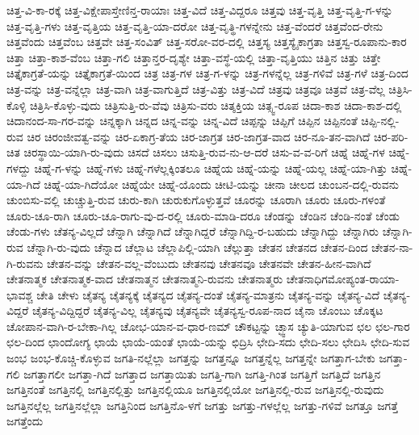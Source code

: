 {ಚಿತ್ತ-ವಿ-ಕಾ-ರಕ್ಕೆ
ಚಿತ್ತ-ವಿಕ್ಷೇಪಾಸ್ತೇಣಿನ್ತ-ರಾಯಾಃ
ಚಿತ್ತ-ವಿದೆ
ಚಿತ್ತ-ವಿದ್ದರೂ
ಚಿತ್ತವು
ಚಿತ್ತ-ವೃತ್ತಿ
ಚಿತ್ತ-ವೃತ್ತಿ-ಗ-ಳನ್ನು
ಚಿತ್ತ-ವೃತ್ತಿ-ಗಳು
ಚಿತ್ತ-ವೃತ್ತಿಯ
ಚಿತ್ತ-ವೃತ್ತಿ-ಯಾ-ದರೋ
ಚಿತ್ತ-ವೃತ್ಥಿ-ಗಳನ್ನೇನು
ಚಿತ್ತ-ವೆಂದರೆ
ಚಿತ್ತವೆಂದ-ರೇನು
ಚಿತ್ತವೆಂದು
ಚಿತ್ತವೆಂಬ
ಚಿತ್ತವೇ
ಚಿತ್ತ-ಸಂವಿತ್
ಚಿತ್ತ-ಸರೋ-ವರ-ದಲ್ಲಿ
ಚಿತ್ತಸ್ಯ
ಚಿತ್ತಸ್ಯೈಕಾಗ್ರತಾ
ಚಿತ್ತಸ್ವ-ರೂಪಾನು-ಕಾರ
ಚಿತ್ತಾ
ಚಿತ್ತಾ-ಕಾಶ-ವೆಂಬ
ಚಿತ್ತಾ-ಗಲಿ
ಚಿತ್ತಾನ್ತರ-ದೃಶ್ಯೇ
ಚಿತ್ತಾ-ವಸ್ಥೆ-ಯಲ್ಲಿ
ಚಿತ್ತಾ-ವೃತ್ತಿಯು
ಚಿತ್ತಿನ
ಚಿತ್ತು
ಚಿತ್ತೇ
ಚಿತ್ತೈಕಾಗ್ರತೆ-ಯನ್ನು
ಚಿತ್ತೈಕಾಗ್ರತೆ-ಯಿಂದ
ಚಿತ್ರ
ಚಿತ್ರ-ಗಳ
ಚಿತ್ರ-ಗ-ಳನ್ನು
ಚಿತ್ರ-ಗಳನ್ನೆಲ್ಲ
ಚಿತ್ರ-ಗಳಿವೆ
ಚಿತ್ರ-ಗಳೆ
ಚಿತ್ರ-ದಿಂದ
ಚಿತ್ರ-ವನ್ನು
ಚಿತ್ರ-ವನ್ನೆಲ್ಲಾ
ಚಿತ್ರ-ವಾಗಿ
ಚಿತ್ರ-ವಾಗುತ್ತಿದೆ
ಚಿತ್ರ-ವಿತ್ತು
ಚಿತ್ರ-ವಿದೆ
ಚಿತ್ರವು
ಚಿತ್ರವೂ
ಚಿತ್ರವೆ
ಚಿತ್ರ-ವೆಲ್ಲ
ಚಿತ್ರಿಸಿ-ಕೊಳ್ಳಿ
ಚಿತ್ರಿಸಿ-ಕೊಳ್ಳು-ವುದು
ಚಿತ್ರಿಸುತ್ತಿ-ರು-ವೆವು
ಚಿತ್ರಿಸು-ವರು
ಚಿತ್ಶಕ್ತಿಯ
ಚಿತ್ಸ್ವ-ರೂಪ
ಚಿದಾ-ಕಾಶ
ಚಿದಾ-ಕಾಶ-ದಲ್ಲಿ
ಚಿದಾನಂದ-ಸಾ-ಗರ-ವನ್ನು
ಚಿನ್ನಕ್ಕಾಗಿ
ಚಿನ್ನದ
ಚಿನ್ನ-ವನ್ನು
ಚಿನ್ನ-ವಿದೆ
ಚಿಪ್ಪನ್ನು
ಚಿಪ್ಪಿಗೆ
ಚಿಪ್ಪಿನ
ಚಿಪ್ಪಿನಂತೆ
ಚಿಪ್ಪಿ-ನಲ್ಲಿ-ರುವ
ಚಿರ
ಚಿರಂಜೀವತ್ವ-ವನ್ನು
ಚಿರ-ಏಕಾಗ್ರ-ತೆಯ
ಚಿರ-ಜಾಗ್ರತ
ಚಿರ-ಜಾಗ್ರತ-ವಾದ
ಚಿರ-ನೂ-ತನ-ವಾಗಿದೆ
ಚಿರ-ಪರಿ-ಚಿತ
ಚಿರಸ್ಥಾಯಿ-ಯಾಗಿ-ರು-ವುದು
ಚಿಸದೆ
ಚಿಸಲು
ಚಿಸುತ್ತಿ-ರುವ-ನು-ಆ-ದರೆ
ಚಿಸು-ವ-ವ-ರಿಗೆ
ಚಿಹ್ನೆ
ಚಿಹ್ನೆ-ಗಳ
ಚಿಹ್ನೆ-ಗಳದ್ದು
ಚಿಹ್ನೆ-ಗ-ಳನ್ನು
ಚಿಹ್ನೆ-ಗಳು
ಚಿಹ್ನೆ-ಗಳೆಲ್ಲಕ್ಕಿಂತಲೂ
ಚಿಹ್ನೆಯ
ಚಿಹ್ನೆ-ಯನ್ನು
ಚಿಹ್ನೆ-ಯಲ್ಲ
ಚಿಹ್ನೆ-ಯಾ-ಗಿತ್ತು
ಚಿಹ್ನೆ-ಯಾ-ಗಿದೆ
ಚಿಹ್ನೆ-ಯಾ-ಗಿದೆಯೋ
ಚಿಹ್ನೆಯೇ
ಚಿಹ್ನೆ-ಯೊಂದು
ಚೀಟಿ-ಯನ್ನು
ಚೀನಾ
ಚೀಲದ
ಚುಂಬನ-ದಲ್ಲಿ-ರುವನು
ಚುಂಬಿಸು-ವಲ್ಲಿ
ಚುಚ್ಚುತ್ತಿ-ರುವ
ಚುರು-ಕಾಗಿ
ಚುರುಕುಗೊಳ್ಳುತ್ತವೆ
ಚೂರನ್ನು
ಚೂರಾಗಿ
ಚೂರು
ಚೂರು-ಗಳಂತೆ
ಚೂರು-ಚೂ-ರಾಗಿ
ಚೂರು-ಚೂ-ರಾಗು-ವು-ದ-ರಲ್ಲಿ
ಚೂರು-ಮಾಡಿ-ದರೂ
ಚೆಂಡನ್ನು
ಚೆಂಡಿನ
ಚೆಂಡಿ-ನಂತೆ
ಚೆಂಡು
ಚೆಂಡು-ಗಳು
ಚೆತನ್ಯ-ವಿಲ್ಲದೆ
ಚೆನ್ನಾಗಿ
ಚೆನ್ನಾಗಿದೆ
ಚೆನ್ನಾಗಿದ್ದರೆ
ಚೆನ್ನಾಗಿದ್ದಿ-ರ-ಬಹುದು
ಚೆನ್ನಾಗಿದ್ದು
ಚೆನ್ನಾಗಿರು
ಚೆನ್ನಾಗಿ-ರುವ
ಚೆನ್ನಾಗಿ-ರು-ವುದು
ಚೆನ್ನಾದ
ಚೆಲ್ಲಾಟ
ಚೆಲ್ಲಾಪಿಲ್ಲಿ-ಯಾಗಿ
ಚೆಲ್ಲುತ್ತಾ
ಚೇತನ
ಚೇತನದ
ಚೇತನ-ದಿಂದ
ಚೇತನ-ನಾ-ಗಿ-ರುವನು
ಚೇತನ-ವನ್ನು
ಚೇತನ-ವಲ್ಲ-ವೆಂಬುದು
ಚೇತನವು
ಚೇತನವೂ
ಚೇತನವೇ
ಚೇತನ-ಹೀನ-ವಾಗಿದೆ
ಚೇತನಾತ್ಮಕ
ಚೇತನಾತ್ಮಕ-ವಾದ
ಚೇತನಾತ್ಮನ
ಚೇತನಾತ್ಮನಿ-ರುವನು
ಚೇತನಾತ್ಮರು
ಚೇತನಾಧಿಗಮೋಪ್ಯಂತ-ರಾಯಾ-ಭಾವಶ್ಚ
ಚೇತಿ
ಚೇಳು
ಚೈತನ್ಯ
ಚೈತನ್ಯಕ್ಕೆ
ಚೈತನ್ಯದ
ಚೈತನ್ಯ-ದಂತೆ
ಚೈತನ್ಯ-ಮಾತ್ರನು
ಚೈತನ್ಯ-ವನ್ನು
ಚೈತನ್ಯ-ವಿದೆ
ಚೈತನ್ಯ-ವಿದ್ದರೆ
ಚೈತನ್ಯ-ವಿದ್ದಿದ್ದರೆ
ಚೈತನ್ಯ-ವಿಲ್ಲ
ಚೈತನ್ಯವು
ಚೈತನ್ಯವೇ
ಚೈತನ್ಯಸ್ವ-ರೂಪ-ನಾದ
ಚೈನಾ
ಚೊಂಬು
ಚೊಕ್ಕಟ
ಚೋಪಾನ-ವಾಗಿ-ರ-ಬೇಕಾ-ಗಿಲ್ಲ
ಚೋಭ-ಯಾನ-ವ-ಧಾರ-ಣಮ್
ಚೌಕಟ್ಟನ್ನು
ಚ್ಛ್ವಾಸ
ಚ್ಯುತಿ-ಯಾಗುವ
ಛಲ
ಛಲ-ಗಾರ
ಛಲ-ದಿಂದ
ಛಾಂದೋಗ್ಯ
ಛಾಯೆ
ಛಾಯೆ-ಯಂತೆ
ಛಾಯೆ-ಯನ್ನು
ಛಿದ್ರಿಸಿ
ಛೇದಿ-ಸದು
ಛೇದಿ-ಸಲು
ಛೇದಿಸಿ
ಛೇದಿ-ಸುವ
ಜಂಭ
ಜಂಭ-ಕೊಚ್ಚಿ-ಕೊಳ್ಳುವ
ಜಗತಿ-ನಲ್ಲೆಲ್ಲಾ
ಜಗತ್ತನ್ನು
ಜಗತ್ತನ್ನೂ
ಜಗತ್ತನ್ನೆಲ್ಲ
ಜಗತ್ತನ್ನೇ
ಜಗತ್ತಾಗ-ಬೇಕು
ಜಗತ್ತಾ-ಗಲಿ
ಜಗತ್ತಾಗಲೀ
ಜಗತ್ತಾ-ಗಿದೆ
ಜಗತ್ತಾದ
ಜಗತ್ತಾಯಿತು
ಜಗತ್ತಿ-ಗಾಗಿ
ಜಗತ್ತಿ-ಗಿಂತ
ಜಗತ್ತಿಗೆ
ಜಗತ್ತಿದೆ
ಜಗತ್ತಿನ
ಜಗತ್ತಿನಂತೆ
ಜಗತ್ತಿನಲ್ಲಿ
ಜಗತ್ತಿನಲ್ಲಿತ್ತು
ಜಗತ್ತಿನಲ್ಲಿಯೂ
ಜಗತ್ತಿನಲ್ಲಿಯೋ
ಜಗತ್ತಿನಲ್ಲಿ-ರುವ
ಜಗತ್ತಿನಲ್ಲಿ-ರುವುದು
ಜಗತ್ತಿನಲ್ಲೆಲ್ಲ
ಜಗತ್ತಿನಲ್ಲೆಲ್ಲಾ
ಜಗತ್ತಿನಿಂದ
ಜಗತ್ತಿನೊ-ಳಗೆ
ಜಗತ್ತು
ಜಗತ್ತು-ಗಳಲ್ಲೆಲ್ಲ
ಜಗತ್ತು-ಗಳಿವೆ
ಜಗತ್ತೂ
ಜಗತ್ತೆ
ಜಗತ್ತೆಂದು
}

